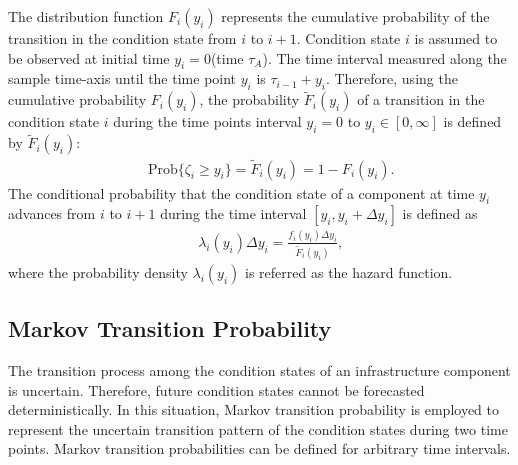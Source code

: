 The distribution function $F_i(y_i)$ represents the cumulative probability of the transition in the condition state from $i$ to $i+1$. Condition state $i$ is assumed to be observed at initial time $y_i=0$(time $\tau_A$). The time interval measured along the sample time-axis until the time point $y_i$ is $\tau_{i-1}+y_i$. Therefore, using the cumulative probability $F_i(y_i)$, the probability $\tilde{F}_i(y_i)$ of a transition in the condition state $i$ during the time points interval $y_i=0$ to $y_i\in [0,\infty]$ is defined by $\tilde{F}_i(y_i)$:
\begin{eqnarray}
&& \mbox{Prob}\{\zeta_i \geq y_i\}= \tilde{F}_i(y_i) = 1 -  F_i(y_i). \label{funcbF}
\end{eqnarray}
The conditional probability that the condition state of a component at time $y_i$ advances from $i$ to $i+1$ during the time interval $[y_i,y_i+\Delta y_i]$ is defined as
\begin{eqnarray}
&& \lambda_i(y_i) \Delta y_i = \frac{f_i(y_i)\Delta y_i}{\tilde{F}_i(y_i)}  \label{riskbF},
\end{eqnarray}
where the probability density $\lambda_i(y_i)$ is referred as the hazard function.
\subsection{Markov Transition Probability}
\label{232}
The transition process among the condition states of an infrastructure component is uncertain. Therefore, future condition states cannot be forecasted deterministically. In this situation, Markov transition probability is employed to represent the uncertain transition pattern of the condition states during two time points. Markov transition probabilities can be defined for arbitrary time intervals. 

